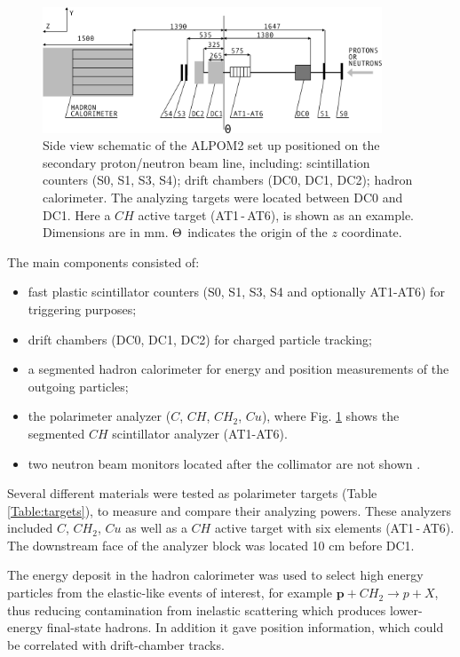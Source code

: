\documentclass[twocolumn,epjc3]{svjour3}
\renewcommand{\vec}[1]{\boldsymbol{#1}} %
\begin{document}
\begin{figure}
  \centering
  \includegraphics[width=0.90\textwidth]{fig07_Alpom2SetUp.png}
  \caption{Side view schematic of the ALPOM2 set up positioned on the secondary proton/neutron beam line, including: scintillation counters (S0, S1, S3, S4); drift chambers (DC0, DC1, DC2); hadron calorimeter. The analyzing targets were located between DC0 and DC1. Here a $CH$ active target (AT1\,-\,AT6), is shown as an example. Dimensions are in mm. $\rm\Theta$ indicates the origin of the $z$ coordinate.}
  \label{fig:ALPOM2SetUp}
\end{figure}

The main components consisted of:
\begin{itemize}
\item fast plastic scintillator counters (S0, S1, S3, S4 and optionally AT1-AT6) for triggering purposes;
\item drift chambers (DC0, DC1, DC2) for charged particle tracking;
\item a segmented hadron calorimeter for energy and position measurements of the outgoing particles;
\item the polarimeter analyzer ($C$, $CH$, $CH_2$, $Cu$), where Fig. \ref{fig:ALPOM2SetUp} shows the segmented $CH$ scintillator analyzer (AT1-AT6).
\item two neutron beam monitors located after the collimator are not shown \cite{Lehar:1996cr}.
\end{itemize}

Several different materials were tested as polarimeter targets (Table \ref{Table:targets}), to measure and compare their analyzing powers. These analyzers included $C$, $CH_2$, $Cu$ as well as a $CH$ active target with six elements (AT1\,-\,AT6). The downstream face of the analyzer block was located 10 cm before DC1.

The energy deposit in the hadron calorimeter was used to select high energy particles from the elastic-like events of interest, for example $\vec p+ CH_{2}\to p+X$, thus reducing contamination from inelastic scattering which produces lower-energy final-state hadrons. In addition it gave position information, which could be correlated with drift-chamber tracks.
\end{document}
